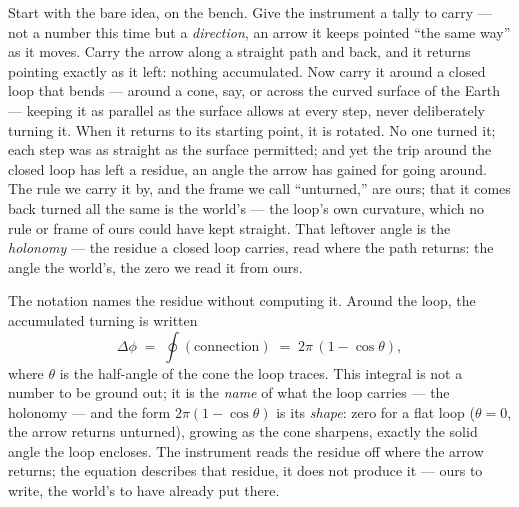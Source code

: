 Start with the bare idea, on the bench. Give the instrument a tally to carry --- not a number this time but a
\emph{direction}, an arrow it keeps pointed ``the same way'' as it moves. Carry the arrow along a straight
path and back, and it returns pointing exactly as it left: nothing accumulated. Now carry it around a closed
loop that bends --- around a cone, say, or across the curved surface of the Earth --- keeping it as parallel
as the surface allows at every step, never deliberately turning it. When it returns to its starting point, it
is rotated. No one turned it; each step was as straight as the surface permitted; and yet the trip around the
closed loop has left a residue, an angle the arrow has gained for going around. The rule we carry it by, and
the frame we call ``unturned,'' are ours; that it comes back turned all the same is the world's --- the loop's
own curvature, which no rule or frame of ours could have kept straight. That leftover angle is the
\emph{holonomy} --- the residue a closed loop carries, read where the path returns: the angle the world's, the
zero we read it from ours.

The notation names the residue without computing it. Around the loop, the accumulated turning is written
\begin{equation}
  \Delta\phi \;=\; \oint (\text{connection}) \;=\; 2\pi\,(1 - \cos\theta),
\end{equation}
where $\theta$ is the half-angle of the cone the loop traces. This integral is not a number to be ground out;
it is the \emph{name} of what the loop carries --- the holonomy --- and the form $2\pi(1 - \cos\theta)$ is its
\emph{shape}: zero for a flat loop ($\theta = 0$, the arrow returns unturned), growing as the cone sharpens,
exactly the solid angle the loop encloses. The instrument reads the residue off where the arrow returns; the
equation describes that residue, it does not produce it --- ours to write, the world's to have already put
there.


